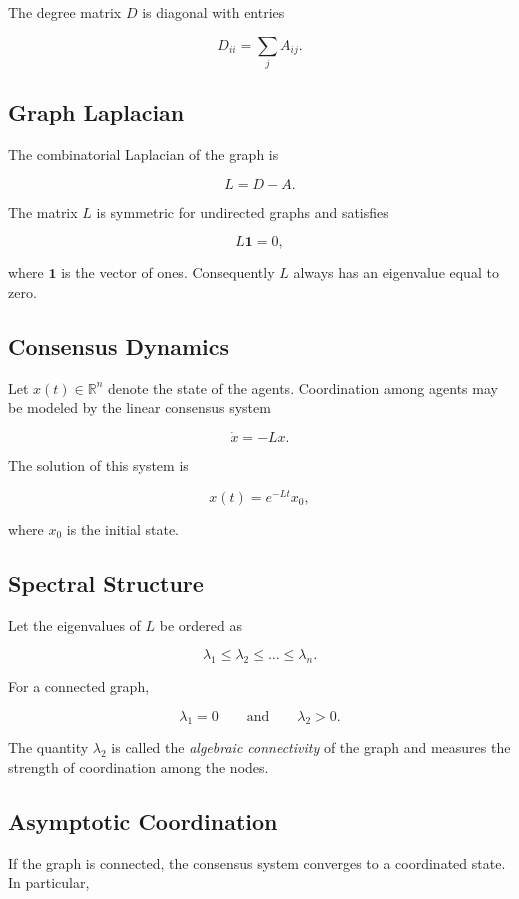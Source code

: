 \documentclass[12pt]{article}
\begin{document}
The degree matrix $D$ is diagonal with entries

\[
D_{ii} = \sum_j A_{ij}.
\]

\subsection{Graph Laplacian}

The combinatorial Laplacian of the graph is

\[
L = D - A .
\]

The matrix $L$ is symmetric for undirected graphs and satisfies

\[
L \mathbf{1} = 0,
\]

where $\mathbf{1}$ is the vector of ones. Consequently $L$ always has an eigenvalue equal to zero.

\subsection{Consensus Dynamics}

Let $x(t) \in \mathbb{R}^n$ denote the state of the agents. Coordination among agents may be modeled by the linear consensus system

\[
\dot{x} = -Lx .
\]

The solution of this system is

\[
x(t) = e^{-Lt}x_0 ,
\]

where $x_0$ is the initial state.

\subsection{Spectral Structure}

Let the eigenvalues of $L$ be ordered as

\[
\lambda_1 \le \lambda_2 \le \dots \le \lambda_n .
\]

For a connected graph,

\[
\lambda_1 = 0
\qquad
\text{and}
\qquad
\lambda_2 > 0 .
\]

The quantity $\lambda_2$ is called the \emph{algebraic connectivity} of the graph and measures the strength of coordination among the nodes.

\subsection{Asymptotic Coordination}

If the graph is connected, the consensus system converges to a coordinated state. In particular,
\end{document}
